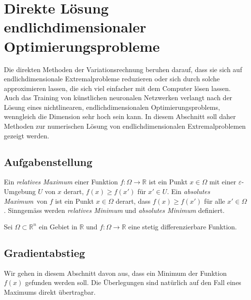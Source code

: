 %
%
%
\section{Direkte Lösung endlichdimensionaler Optimierungsprobleme
\label{buch:direkt:section:gradient}}
Die direkten Methoden der Variationsrechnung beruhen darauf, dass
sie sich auf endlichdimensionale Extremalprobleme reduzieren oder
sich durch solche approximieren lassen, die sich viel einfacher
mit dem Computer lösen lassen.
Auch das Training von künstlichen neuronalen Netzwerken verlangt nach
der Lösung eines nichtlinearen, endlichdimensionalen Optimierungsproblems,
wenngleich die Dimension sehr hoch sein kann.
In diesem Abschnitt soll daher Methoden zur numerischen Lösung von
endlichdimensionalen Extremalproblemen gezeigt werden.

%
%
\subsection{Aufgabenstellung
\label{buch:direkt:gradient:subsection:aufgabenstellung}}

\begin{definition}
Ein {\em relatives Maximum} einer Funktion $f\colon\Omega\to\mathbb{R}$
ist ein Punkt $x\in\Omega$ mit einer $\varepsilon$-Umgebung
$U$ von $x$ derart, $f(x)\ge f(x')$ für $x'\in U$.
Ein {\em absolutes Maximum} von $f$ ist ein Punkt $x\in\Omega$ derart,
dass $f(x)\ge f(x')$ für alle $x'\in\Omega$.
Sinngemäss werden {\em relatives Minimum} und {\em absolutes Minimum}
definiert.
%
%
%
%
%
%
%
%
\end{definition}

\begin{aufgabe}
\label{buch:direkt:gradient:aufgabe:extremal}
Sei $\Omega\subset\mathbb{R}^n$ ein Gebiet in $\mathbb{R}$ und
$f\colon\Omega\to\mathbb{R}$ eine stetig differenzierbare
Funktion.
\end{aufgabe}

%
%
\subsection{Gradientabstieg
\label{buch:direkt:gradient:subdsection:gradientabstieg}}
Wir gehen in diesem Abschnitt davon aus, dass ein Minimum der Funktion
$f(x)$ gefunden werden soll.
Die Überlegungen sind natürlich auf den Fall eines Maximums direkt
übertragbar.

